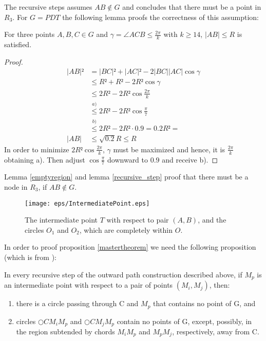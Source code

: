 The recursive steps assumes $AB \notin G $ and concludes that there must be a point in $R_3 $.
For $G=PDT $ the following lemma proofs the correctness of this assumption:
\begin{lemma}
\label{recursive_step}
For three points $A, B, C \in G $ and $\gamma=\angle{ACB}\leq \frac{2\pi}{k} $ with $k\geq 14 $, $|AB|\leq R $ is satisfied.
\end{lemma} 
\begin{proof}

\begin{equation*}
\begin{split}
  |AB|² &=|BC|²+|AC|² - 2|BC||AC|\cos{\gamma} \\
  &\leq R²+R²   - 2R²\cos{\gamma} \\
  &\leq 2R² - 2R²\cos{\frac{2\pi}{k}}\\
  &\stackrel{a)}{\leq} 2R² - 2R²\cos{\frac{\pi}{7}}\\
  &\stackrel{b)}{\leq} 2R² - 2R²\cdot 0.9 = 0.2R²=\\
  |AB| &\leq \sqrt{0.2} R \leq R
\end{split}
\end{equation*}
In order to minimize $2R²\cos{\frac{2\pi}{k}} $, $\gamma $ must be maximized and hence, it is $\frac{2\pi}{k} $ obtaining a).
Then adjust $\cos{\frac{\pi}{7}} $ downward to $0.9 $ and receive b).
 
\end{proof}

Lemma \ref{emptyregion} and lemma \ref{recursive_step} proof that there must be a node in $R_3 $, if $AB \notin G $.



\begin{figure}[h!]
\centering
\texttt{[image: eps/IntermediatePoint.eps]}
\caption{The intermediate point $T $ with respect to pair $(A,B) $, and the circles $O_1 $ and $O_2 $, which are completely within $O $. }
\label{fig:intermediate_point}
\end{figure}


In order to proof proposition \ref{mastertheorem} we need the following proposition (which is from \cite{kanj}):

\begin{prop}
\label{outward_path}
In every recursive step of the outward path construction described above, if $M_p $ is an intermediate point with respect to a pair of points $(M_i, M_j) $, then:
\begin{enumerate}
\renewcommand{\labelenumi}{\alph{enumi})}
\item there is a circle passing through C and $M_p $ that contains no point of G, and
\item circles $\bigcirc{CM_iM_p} $ and $\bigcirc{CM_jM_p} $ contain no points of G, except, possibly, in the region subtended by chords $M_iM_p $ and $M_pM_j $, respectively, away from C.
\end{enumerate}
\end{prop}

